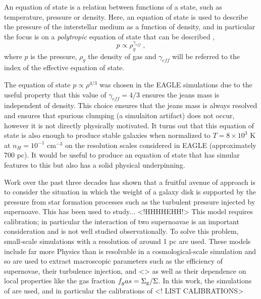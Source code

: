 An equation of state is a relation between functions of a state, such as temperature, pressure or density. 
Here, an equation of state is used to describe the pressure of the interstellar medium as a function of density, and in particular the focus is on a \emph{polytropic} equation of state that can be described \citep{horedt_polytropes_2004},
\begin{equation}
\label{eqn:polytrope}
p \propto \rho_g ^ {\gamma_{eff}}~,
\end{equation}
where $p$ is the pressure, $\rho_g$ the density of gas and $\gamma_{eff}$ will be referred to the index of the effective equation of state.

The equation of state $p \propto \rho^{4/3}$ was chosen in the EAGLE simulations \citep{schaye_eagle_2015} due to the useful property that this value of $\gamma_{eff} = 4/3$ ensures the jeans mass is independent of density.
This choice ensures that the jeans mass is always resolved and ensures that spurious clumping (a simulaiton artifact) does not occur, however it is not directly physically motivated.
It turns out that this equation of state is also enough to produce stable galaxies when normalized to $T = 8\times 10^3$ K at $n_H = 10^{-1}$ cm$^{-3}$ on the resolution scales considered in EAGLE (approximately 700 pc).
It would be useful to produce an equation of state that has simular features to this but also has a solid physical underpinning.

Work over the past three decades has shown that a fruitful avenue of approach is to consider the situation in which the weight of a galaxy disk is supported by the pressure from star formation processes such as the turbulent pressure injected by supernoave. 
This has been used to study... <!HHHHEHH!>
This model requires calibration; in particular the interaction of two supernoavae is an important consideration and is not well studied observationally.
To solve this problem, small-scale simulations with a resolution of around 1 pc \citep{martizzi_supernova_2015} are used.
These models include far more Physics than is resolvable in a cosmological-scale simulation and so are used to extract macroscopic parameters such as the efficiency of supernovae, their turbulence injection, and <> as well as their dependence on local properties like the gas fraction $f_gas = \Sigma_\mathrm{g}/\Sigma$.
In this work, the simulations of \citet{martizzi_supernova_2015} are used, and in particular the calibrations of
<! LIST CALIBRATIONS>
